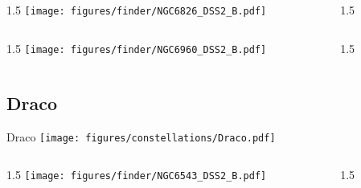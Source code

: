 \documentclass[final]{beamer}
\newlength{\colwidth}
\begin{document}

\begin{frame}[t]{}
  \begin{columns}[T]
    \begin{column}{1.5\colwidth}
      \centering
      \texttt{[image: figures/finder/NGC6826\_DSS2\_B.pdf]}
    \end{column}
    \begin{column}{1.5\colwidth}
      \Large
      
    \end{column}
  \end{columns}
  \vspace{\fill}
  \begin{columns}[T]
    \begin{column}{1.5\colwidth}
      \centering
      \texttt{[image: figures/finder/NGC6960\_DSS2\_B.pdf]}
    \end{column}
    \begin{column}{1.5\colwidth}
      \Large
      
    \end{column}
  \end{columns}
\end{frame}

\subsection{Draco}

\begin{frame}[t]{\LARGE Draco}
  \centering
  \texttt{[image: figures/constellations/Draco.pdf]}
\end{frame}


\begin{frame}[t]{}
  \begin{columns}[T]
    \begin{column}{1.5\colwidth}
      \centering
      \texttt{[image: figures/finder/NGC6543\_DSS2\_B.pdf]}
    \end{column}
    \begin{column}{1.5\colwidth}
      \Large
      
    \end{column}
  \end{columns}
  \vspace{\fill}
\end{frame}
\end{document}

